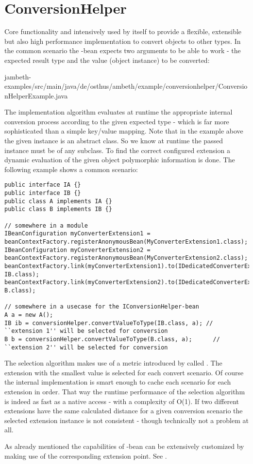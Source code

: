 \goodbreak
\section{ConversionHelper}
\label{feature:ConversionHelper}
Core functionality and intensively used by \AMBETH{} itself to provide a flexible, extensible but also high performance implementation to convert objects to other types. In the common scenario the -bean expects two arguments to be able to work - the expected result type and the value (object instance) to be converted:

{jambeth-examples/src/main/java/de/osthus/ambeth/example/conversionhelper/ConversionHelperExample.java}

The implementation algorithm evaluates at runtime the appropriate internal conversion process according to the given expected type - which is far more sophisticated than a simple key/value mapping. Note that in the example above the given  instance is an abstract class. So we know at runtime the passed instance must be of any subclass. To find the correct configured extension a dynamic evaluation of the given object polymorphic information is done. The following example shows a common scenario:

\begin{lstlisting}[style=Java]
public interface IA {}
public interface IB {}
public class A implements IA {}
public class B implements IB {}

// somewhere in a module
IBeanConfiguration myConverterExtension1 = beanContextFactory.registerAnonymousBean(MyConverterExtension1.class);
IBeanConfiguration myConverterExtension2 = beanContextFactory.registerAnonymousBean(MyConverterExtension2.class);
beanContextFactory.link(myConverterExtension1).to(IDedicatedConverterExtendable.class).with(IA.class, IB.class);
beanContextFactory.link(myConverterExtension2).to(IDedicatedConverterExtendable.class).with(IA.class, B.class);

// somewhere in a usecase for the IConversionHelper-bean
A a = new A();
IB ib = conversionHelper.convertValueToType(IB.class, a); // ``extension 1'' will be selected for conversion
B b = conversionHelper.convertValueToType(B.class, a);		// ``extension 2'' will be selected for conversion
\end{lstlisting}

The selection algorithm makes use of a metric introduced by \AMBETH{} called . The extension with the smallest value is selected for each convert scenario. Of course the internal implementation is smart enough to cache each scenario for each extension in order. That way the runtime performance of the selection algorithm is indeed as fast as a native  access - with a complexity of O(1). If two different extensions have the same calculated distance for a given conversion scenario the selected extension instance is not consistent - though technically not a problem at all.

As already mentioned the capabilities of -bean can be extensively customized by making use of the corresponding extension point. See .